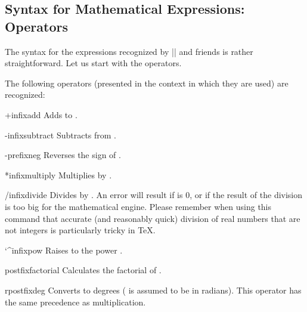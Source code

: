 \subsection{Syntax for Mathematical Expressions: Operators}

The syntax for the expressions recognized by |\pgfmathparse| and friends is
rather straightforward. Let us start with the operators.

\label{pgfmath-operators}

The following operators (presented in the context in which they are used) are
recognized:
%
\begin{math-operator}{+}{infix}{add}
    Adds  to .
\end{math-operator}

\begin{math-operator}{-}{infix}{subtract}
    Subtracts  from .
\end{math-operator}

\begin{math-operator}{-}{prefix}{neg}
    Reverses the sign of .
\end{math-operator}

\begin{math-operator}{*}{infix}{multiply}
    Multiplies  by .
\end{math-operator}

\begin{math-operator}{/}{infix}{divide}
    Divides  by . An error will result if  is 0, or if
    the result of the division is too big for the mathematical engine. Please
    remember when using this command that accurate (and reasonably quick)
    division of real numbers that are not integers is particularly tricky in
    \TeX.
\end{math-operator}

\begin{math-operator}{\char`\^}{infix}{pow}
    Raises  to the power .
\end{math-operator}

\begin{math-operator}{\protect\exclamationmarktext}{postfix}{factorial}
    Calculates the factorial of .
\end{math-operator}

\begin{math-operator}{r}{postfix}{deg}
    Converts  to degrees ( is assumed to be in radians). This
    operator has the same precedence as multiplication.
\end{math-operator}

